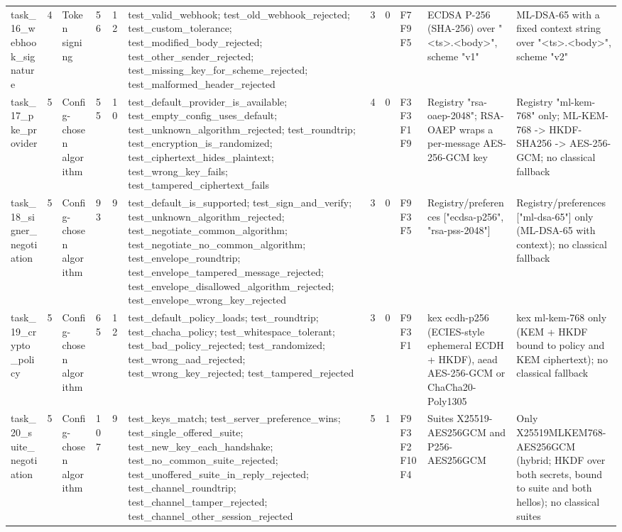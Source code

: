 \begin{table}[t]
\begin{tabular}{lllllllllll}
task\_16\_webhook\_signature & 4 & Token signing & 56 & 12 & test\_valid\_webhook; test\_old\_webhook\_rejected; test\_custom\_tolerance; test\_modified\_body\_rejected; test\_other\_sender\_rejected; test\_missing\_key\_for\_scheme\_rejected; test\_malformed\_header\_rejected & 3 & 0 & F7 F9 F5 & ECDSA P-256 (SHA-256) over "<ts>.<body>", scheme "v1" & ML-DSA-65 with a fixed context string over "<ts>.<body>", scheme "v2" \\
task\_17\_pke\_provider & 5 & Config-chosen algorithm & 55 & 10 & test\_default\_provider\_is\_available; test\_empty\_config\_uses\_default; test\_unknown\_algorithm\_rejected; test\_roundtrip; test\_encryption\_is\_randomized; test\_ciphertext\_hides\_plaintext; test\_wrong\_key\_fails; test\_tampered\_ciphertext\_fails & 4 & 0 & F3 F3 F1 F9 & Registry {"rsa-oaep-2048"}; RSA-OAEP wraps a per-message AES-256-GCM key & Registry {"ml-kem-768"} only; ML-KEM-768 -> HKDF-SHA256 -> AES-256-GCM; no classical fallback \\
task\_18\_signer\_negotiation & 5 & Config-chosen algorithm & 93 & 9 & test\_default\_is\_supported; test\_sign\_and\_verify; test\_unknown\_algorithm\_rejected; test\_negotiate\_common\_algorithm; test\_negotiate\_no\_common\_algorithm; test\_envelope\_roundtrip; test\_envelope\_tampered\_message\_rejected; test\_envelope\_disallowed\_algorithm\_rejected; test\_envelope\_wrong\_key\_rejected & 3 & 0 & F9 F3 F5 & Registry/preferences ["ecdsa-p256", "rsa-pss-2048"] & Registry/preferences ["ml-dsa-65"] only (ML-DSA-65 with context); no classical fallback \\
task\_19\_crypto\_policy & 5 & Config-chosen algorithm & 65 & 12 & test\_default\_policy\_loads; test\_roundtrip; test\_chacha\_policy; test\_whitespace\_tolerant; test\_bad\_policy\_rejected; test\_randomized; test\_wrong\_aad\_rejected; test\_wrong\_key\_rejected; test\_tampered\_rejected & 3 & 0 & F9 F3 F1 & kex ecdh-p256 (ECIES-style ephemeral ECDH + HKDF), aead AES-256-GCM or ChaCha20-Poly1305 & kex ml-kem-768 only (KEM + HKDF bound to policy and KEM ciphertext); no classical fallback \\
task\_20\_suite\_negotiation & 5 & Config-chosen algorithm & 107 & 9 & test\_keys\_match; test\_server\_preference\_wins; test\_single\_offered\_suite; test\_new\_key\_each\_handshake; test\_no\_common\_suite\_rejected; test\_unoffered\_suite\_in\_reply\_rejected; test\_channel\_roundtrip; test\_channel\_tamper\_rejected; test\_channel\_other\_session\_rejected & 5 & 1 & F9 F3 F2 F10 F4 & Suites X25519-AES256GCM and P256-AES256GCM & Only X25519MLKEM768-AES256GCM (hybrid; HKDF over both secrets, bound to suite and both hellos); no classical suites \\
\hline
\end{tabular}
\end{table}
